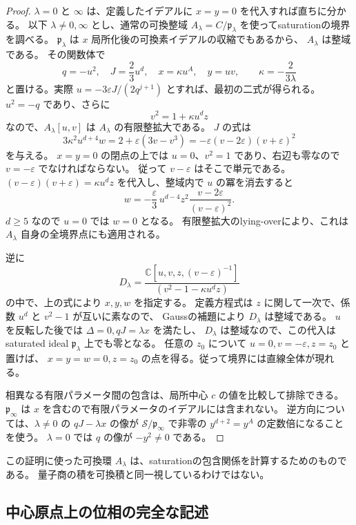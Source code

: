 \begin{proof}
$\lambda=0$ と $\infty$ は、定義したイデアルに $x=y=0$ を代入すれば直ちに分かる。
以下 $\lambda\ne0,\infty$ とし、通常の可換整域
$A_\lambda=C/\mathfrak p_\lambda$ を使ってsaturationの境界を調べる。
$\mathfrak p_\lambda$ は $x$ 局所化後の可換素イデアルの収縮でもあるから、
$A_\lambda$ は整域である。
その関数体で
\[
 q=-u^2,\quad J=\frac23u^d,\quad
 x=\kappa u^A,\quad y=uv,\qquad
 \kappa=-\frac{2}{3\lambda}
\]
と置ける。実際
$u=-3\varepsilon J/(2q^{j+1})$ とすれば、最初の二式が得られる。
$u^2=-q$ であり、さらに
\[
 v^2=1+\kappa u^dz
\]
なので、$A_\lambda[u,v]$ は $A_\lambda$ の有限整拡大である。
$J$ の式は
\[
 3\kappa^2u^{d+4}w
   =2+\varepsilon(3v-v^3)
   =-\varepsilon(v-2\varepsilon)(v+\varepsilon)^2
\]
を与える。
$x=y=0$ の閉点の上では $u=0$、$v^2=1$ であり、右辺も零なので
$v=-\varepsilon$ でなければならない。
従って $v-\varepsilon$ はそこで単元である。
$(v-\varepsilon)(v+\varepsilon)=\kappa u^dz$ を代入し、整域内で $u$ の冪を消去すると
\[
 \boxed{
 w=-\frac{\varepsilon}{3}\,
       u^{d-4}z^2\frac{v-2\varepsilon}{(v-\varepsilon)^2}.
 }
\]
$d\ge5$ なので $u=0$ では $w=0$ となる。
有限整拡大のlying-overにより、これは $A_\lambda$ 自身の全境界点にも適用される。

逆に
\[
 D_\lambda=
 \frac{\mathbb C[u,v,z,(v-\varepsilon)^{-1}]}
      {(v^2-1-\kappa u^dz)}
\]
の中で、上の式により $x,y,w$ を指定する。
定義方程式は $z$ に関して一次で、係数 $u^d$ と $v^2-1$ が互いに素なので、
Gaussの補題により $D_\lambda$ は整域である。
$u$ を反転した後では $\Delta=0,qJ=\lambda x$ を満たし、
$D_\lambda$ は整域なので、この代入はsaturated ideal
$\mathfrak p_\lambda$ 上でも零となる。
任意の $z_0$ について $u=0,v=-\varepsilon,z=z_0$ と置けば、
$x=y=w=0,z=z_0$ の点を得る。従って境界には直線全体が現れる。

相異なる有限パラメータ間の包含は、局所中心 $c$ の値を比較して排除できる。
$\mathfrak p_\infty$ は $x$ を含むので有限パラメータのイデアルには含まれない。
逆方向については、$\lambda\ne0$ の $qJ-\lambda x$ の像が
$\mathcal S/\mathfrak p_\infty$ で非零の $y^{d+2}=y^A$ の定数倍になることを使う。
$\lambda=0$ では $q$ の像が $-y^2\ne0$ である。
\end{proof}

この証明に使った可換環 $A_\lambda$ は、saturationの包含関係を計算するためのものである。
量子商の積を可換積と同一視しているわけではない。

\subsection{中心原点上の位相の完全な記述}

